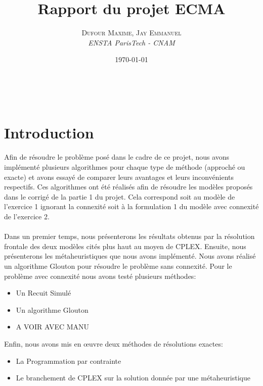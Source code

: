\documentclass[a4paper, 11pt]{article} %
\title{\textbf{Rapport du projet ECMA}} %
\author{\textsc{Dufour Maxime, Jay Emmanuel} %
\\{\textit{ENSTA ParisTech - CNAM}}} %
\date{\today} %
\makeatletter
\renewcommand{\maketitle}{ %
\begin{flushright} %
{\LARGE\@title} %

\vspace{30pt} %

{\large\@author} %
\\\@date %

\vspace{20pt} %
\end{flushright}
}
\makeatother
\begin{document}
\vspace{200pt}

\maketitle %

\section*{Introduction}

\paragraph*{}
Afin de résoudre le problème posé dans le cadre de ce projet, nous avons implémenté plusieurs algorithmes pour chaque type de méthode (approché ou exacte) et avons essayé de comparer leurs avantages et leurs inconvénients respectifs. Ces algorithmes ont été réalisés afin de résoudre les modèles proposés dans le corrigé de la partie 1 du projet. Cela correspond soit au modèle de l'exercice 1 ignorant la connexité soit à la formulation 1 du modèle avec connexité de l'exercice 2.

\paragraph*{}
Dans un premier temps, nous présenterons les résultats obtenus par la résolution frontale des deux modèles cités plus haut au moyen de CPLEX. Ensuite, nous présenterons les métaheuristiques que nous avons implémenté. Nous avons réalisé un algorithme Glouton pour résoudre le problème sans connexité. Pour le problème avec connexité nous avons testé plusieurs méthodes:

\begin{itemize}
\item Un Recuit Simulé
\item Un algorithme Glouton
\item A VOIR AVEC MANU
\end{itemize}

Enfin, nous avons mis en œuvre deux méthodes de résolutions exactes:
\begin{itemize}
\item La Programmation par contrainte
\item Le branchement de CPLEX sur la solution donnée par une métaheuristique
\end{itemize}
\end{document}
